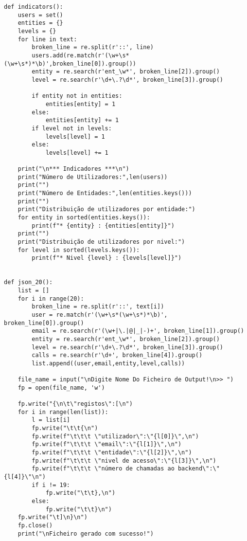 \documentclass[11pt,a4paper]{report}%
\begin{document}
\begin{verbatim}
def indicators():
    users = set()
    entities = {}
    levels = {}
    for line in text:
        broken_line = re.split(r'::', line)
        users.add(re.match(r'(\w+\s*(\w+\s*)*\b)',broken_line[0]).group())
        entity = re.search(r'ent_\w*', broken_line[2]).group()
        level = re.search(r'\d+\.?\d*', broken_line[3]).group()

        if entity not in entities:
            entities[entity] = 1
        else:
            entities[entity] += 1
        if level not in levels:
            levels[level] = 1
        else:
            levels[level] += 1

    print("\n*** Indicadores ***\n")
    print("Número de Utilizadores:",len(users))
    print("")
    print("Número de Entidades:",len(entities.keys()))
    print("")
    print("Distribuição de utilizadores por entidade:")
    for entity in sorted(entities.keys()):
        print(f"* {entity} : {entities[entity]}")
    print("")
    print("Distribuição de utilizadores por nivel:")
    for level in sorted(levels.keys()):
        print(f"* Nivel {level} : {levels[level]}")


def json_20():
    list = []
    for i in range(20):
        broken_line = re.split(r'::', text[i])
        user = re.match(r'(\w+\s*(\w+\s*)*\b)', broken_line[0]).group()
        email = re.search(r'(\w+|\.|@|_|-)+', broken_line[1]).group()
        entity = re.search(r'ent_\w*', broken_line[2]).group()
        level = re.search(r'\d+\.?\d*', broken_line[3]).group()
        calls = re.search(r'\d+', broken_line[4]).group()
        list.append((user,email,entity,level,calls))

    file_name = input("\nDigite Nome Do Ficheiro de Output!\n>> ")
    fp = open(file_name, 'w')

    fp.write("{\n\t\"registos\":[\n")
    for i in range(len(list)):
        l = list[i]
        fp.write("\t\t{\n")
        fp.write(f"\t\t\t \"utilizador\":\"{l[0]}\",\n")
        fp.write(f"\t\t\t \"email\":\"{l[1]}\",\n")
        fp.write(f"\t\t\t \"entidade\":\"{l[2]}\",\n")
        fp.write(f"\t\t\t \"nivel de acesso\":\"{l[3]}\",\n")
        fp.write(f"\t\t\t \"número de chamadas ao backend\":\"{l[4]}\"\n")
        if i != 19:
            fp.write("\t\t},\n")
        else:
            fp.write("\t\t}\n")
    fp.write("\t]\n}\n")
    fp.close()
    print("\nFicheiro gerado com sucesso!")



\end{verbatim}
\end{document}
